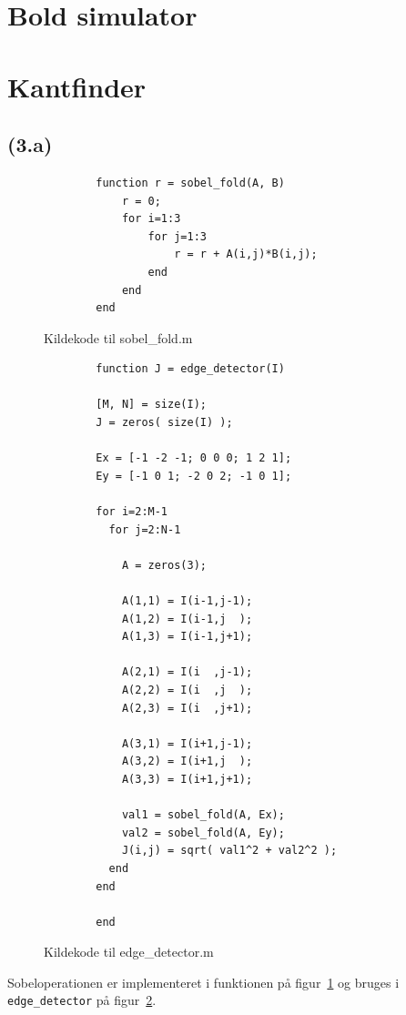 \documentclass{article}
\begin{document}
\section{Bold                                 simulator}

\section{Kantfinder}

\subsection*{(3.a)}

\begin{figure}
	\begin{verbatim}
		function r = sobel_fold(A, B)
		    r = 0;
		    for i=1:3
		        for j=1:3
		            r = r + A(i,j)*B(i,j);
		        end
		    end
		end
	\end{verbatim}
	\caption{Kildekode til sobel\_fold.m}
	\label{sobelfold}
\end{figure}

\begin{figure}
	\begin{verbatim}
		function J = edge_detector(I)

		[M, N] = size(I);
		J = zeros( size(I) );

		Ex = [-1 -2 -1; 0 0 0; 1 2 1];
		Ey = [-1 0 1; -2 0 2; -1 0 1];

		for i=2:M-1
		  for j=2:N-1

		    A = zeros(3);

		    A(1,1) = I(i-1,j-1);
		    A(1,2) = I(i-1,j  );
		    A(1,3) = I(i-1,j+1);

		    A(2,1) = I(i  ,j-1);
		    A(2,2) = I(i  ,j  );
		    A(2,3) = I(i  ,j+1);

		    A(3,1) = I(i+1,j-1);
		    A(3,2) = I(i+1,j  );
		    A(3,3) = I(i+1,j+1);

		    val1 = sobel_fold(A, Ex);
		    val2 = sobel_fold(A, Ey);
		    J(i,j) = sqrt( val1^2 + val2^2 );
		  end
		end

		end
	\end{verbatim}
	\caption{Kildekode til edge\_detector.m}
	\label{edgedetector}
\end{figure}

Sobeloperationen er implementeret i funktionen på figur~\ref{sobelfold} og bruges i {\tt edge\_detector} på figur~\ref{edgedetector}.
\end{document}
